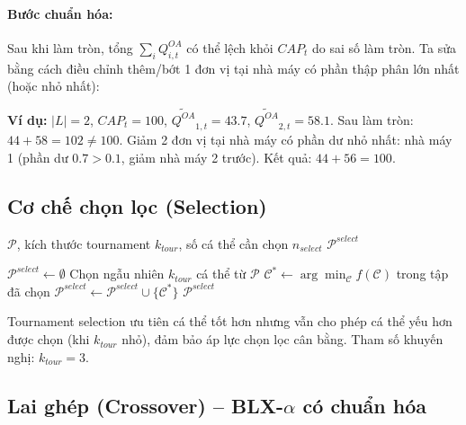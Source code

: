 \documentclass[12pt]{article}
\newcommand{\QOA}{Q^{OA}}
\begin{document}
\paragraph{Bước chuẩn hóa:} Sau khi làm tròn, tổng $\sum_i \QOA_{i,t}$ có thể lệch khỏi $CAP_t$ do sai số làm tròn. Ta sửa bằng cách điều chỉnh thêm/bớt 1 đơn vị tại nhà máy có phần thập phân lớn nhất (hoặc nhỏ nhất):

\vspace{0.3em}
\noindent\textbf{Ví dụ:} $|L|=2$, $CAP_t = 100$, $\widetilde{\QOA}_{1,t}=43.7$, $\widetilde{\QOA}_{2,t}=58.1$. Sau làm tròn: $44+58=102 \neq 100$. Giảm 2 đơn vị tại nhà máy có phần dư nhỏ nhất: nhà máy 1 (phần dư $0.7 > 0.1$, giảm nhà máy 2 trước). Kết quả: $44 + 56 = 100$.

\subsection{Cơ chế chọn lọc (Selection)}

\begin{algorithm}[H]
\caption{Tournament Selection}
\label{alg:selection}
\begin{algorithmic}[1]
\Require $\mathcal{P}$, kích thước tournament $k_{tour}$, số cá thể cần chọn $n_{select}$
\Ensure $\mathcal{P}^{select}$

\State $\mathcal{P}^{select} \gets \emptyset$
  \State Chọn ngẫu nhiên $k_{tour}$ cá thể từ $\mathcal{P}$
  \State $\mathcal{C}^* \gets \arg\min_{\mathcal{C}} f(\mathcal{C})$ trong tập đã chọn
  \State $\mathcal{P}^{select} \gets \mathcal{P}^{select} \cup \{\mathcal{C}^*\}$
\EndWhile
\State \Return $\mathcal{P}^{select}$
\end{algorithmic}
\end{algorithm}

\noindent Tournament selection ưu tiên cá thể tốt hơn nhưng vẫn cho phép cá thể yếu hơn được chọn (khi $k_{tour}$ nhỏ), đảm bảo áp lực chọn lọc cân bằng. Tham số khuyến nghị: $k_{tour} = 3$.

\subsection{Lai ghép (Crossover) -- BLX-$\alpha$ có chuẩn hóa}
\end{document}
